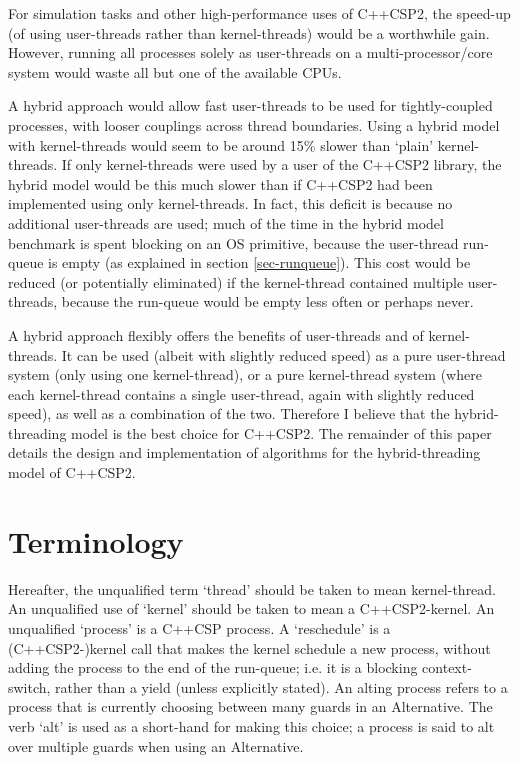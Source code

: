 \documentclass[12pt]{IOS-Book-Article-CPA-2007}
\begin{document}
For simulation tasks and other high-performance uses of C++CSP2, the speed-up (of using user-threads rather than kernel-threads) would be a worthwhile 
gain.  However, running all processes solely as user-threads on a multi-processor/core system would waste all but one of the available CPUs.

A hybrid approach would allow fast user-threads to be used for tightly-coupled processes, with looser couplings across thread boundaries.  Using a hybrid
model with kernel-threads would seem to be around 15\% slower than `plain' kernel-threads.  If only kernel-threads were used by a user of the C++CSP2 
library, the hybrid model would be this much slower than if C++CSP2 had been implemented using only kernel-threads.
In fact, this deficit is because no additional user-threads are used; much of the time in the hybrid model benchmark is spent blocking on an OS primitive, 
because the user-thread run-queue is empty (as explained in section \ref{sec-runqueue}).  
This cost would be reduced (or potentially eliminated) if the kernel-thread contained multiple user-threads, because the run-queue would be empty less often or perhaps never.

A hybrid approach flexibly offers the benefits of user-threads and of kernel-threads.  It can be used (albeit with slightly reduced speed) as a pure user-thread
system (only using one kernel-thread), or a pure kernel-thread system (where each kernel-thread contains a single user-thread, again with 
slightly reduced speed), as well as a combination of the two.  Therefore I believe that the hybrid-threading model is the best choice for C++CSP2.  
The remainder of this paper details the design and implementation of algorithms for the hybrid-threading model of C++CSP2.


\section{Terminology}

\label{sec-term}

Hereafter, the unqualified term `thread' should be taken to mean kernel-thread.  An unqualified use of `kernel' should be taken to mean a 
C++CSP2-kernel.  An unqualified `process' is a C++CSP process.  A `reschedule' is a (C++CSP2-)kernel call that makes the kernel schedule a new 
process, without adding the process to the end of the run-queue; i.e. it is a blocking context-switch, rather than a yield (unless explicitly stated).  
An alting process refers to a process that is currently choosing between many guards in an Alternative.  The verb `alt' is used as a short-hand for 
making this choice; a process is said to alt over multiple guards when using an Alternative.
\end{document}
